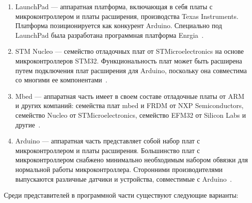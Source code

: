 \documentclass{altsu-report}
\begin{document}
\begin{enumerate}
    \item LaunchPad --- аппаратная платформа, включающая в себя платы с микроконтроллером и платы расширения, производства Texas Instruments. Платформа позиционируется как конкурент Arduino. Специально под LaunchPad была разработана программная платформа Enrgia~\cite{LaunchPad, TI}.
    
    \item STM Nucleo --- семейство отладочных плат от STMicroelectronics на основе микроконтроллеров STM32. Функциональность плат может быть расширена путем подключения плат расширения для Arduino, поскольку она совместима со многими ее компонентами~\cite{Nucleo, STM}.
    
    \item Mbed --- аппаратная часть имеет в своем составе отладочные платы от ARM и других компаний:  семейства плат mbed и FRDM от NXP Semiconductors, семейство Nucleo от STMicroelectronics, семейство EFM32 от Silicon Labs и другие~\cite{Mbed}.
    
    \item Arduino --- аппаратная часть представляет собой набор плат с микроконтроллером и платы расширения. Большинство плат с микроконтроллером снабжено минимально необходимым набором обвязки для нормальной работы микроконтроллера. Сторонними производителями выпускаются различные датчики и устройства, совместимые с Arduino~\cite{wikiRUArduino}.
\end{enumerate}

Среди представителей в программной части существуют следующие варианты:
\end{document}
